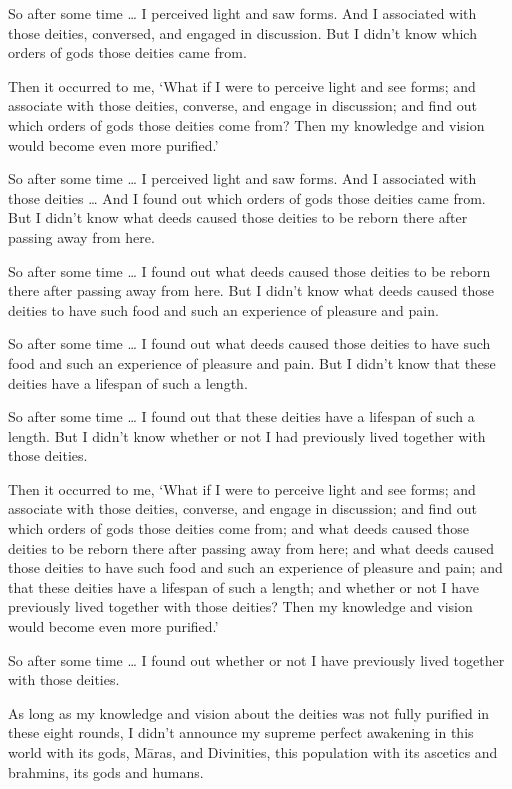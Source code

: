 \documentclass[12pt,openany]{book}%
\begin{document}
So after some time … I perceived light and saw forms. And I associated with those deities, conversed, and engaged in discussion. But I didn’t know which orders of gods those deities came from. 

Then it occurred to me, ‘What if I were to perceive light and see forms; and associate with those deities, converse, and engage in discussion; and find out which orders of gods those deities come from? Then my knowledge and vision would become even more purified.’ 

So after some time … I perceived light and saw forms. And I associated with those deities … And I found out which orders of gods those deities came from. But I didn’t know what deeds caused those deities to be reborn there after passing away from here. 

So after some time … I found out what deeds caused those deities to be reborn there after passing away from here. But I didn’t know what deeds caused those deities to have such food and such an experience of pleasure and pain. 

So after some time … I found out what deeds caused those deities to have such food and such an experience of pleasure and pain. But I didn’t know that these deities have a lifespan of such a length. 

So after some time … I found out that these deities have a lifespan of such a length. But I didn’t know whether or not I had previously lived together with those deities. 

Then it occurred to me, ‘What if I were to perceive light and see forms; and associate with those deities, converse, and engage in discussion; and find out which orders of gods those deities come from; and what deeds caused those deities to be reborn there after passing away from here; and what deeds caused those deities to have such food and such an experience of pleasure and pain; and that these deities have a lifespan of such a length; and whether or not I have previously lived together with those deities? Then my knowledge and vision would become even more purified.’ 

So after some time … I found out whether or not I have previously lived together with those deities. 

As long as my knowledge and vision about the deities was not fully purified in these eight rounds, I didn’t announce my supreme perfect awakening in this world with its gods, \textsanskrit{Māras}, and Divinities, this population with its ascetics and brahmins, its gods and humans. 
\end{document}
